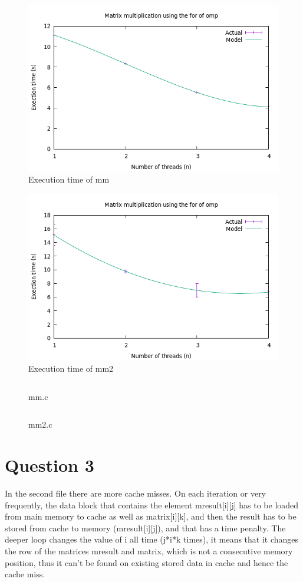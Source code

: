 \documentclass[12pt]{article}
\begin{document}
\begin{figure}[h!]
	\centering
	\includegraphics[width=0.7\linewidth]{mm.png}
	\caption{Execution time of mm}
	\label{fig:mm}
\end{figure}

\begin{figure}[h!]
	\centering
	\includegraphics[width=0.7\linewidth]{mm2.png}
	\caption{Execution time of mm2}
	\label{fig:mm2}
\end{figure}

\newpage

\begin{figure}[h!]
	\inputminted{c}{mm.c}
	\caption{mm.c}\label{code:mmomp}
\end{figure}

\newpage

\begin{figure}[h!]
	\inputminted{c}{mm2.c}
	\caption{mm2.c}\label{code:mm2omp}
\end{figure}

\newpage

\section*{Question 3}

In the second file there are more cache misses. On each iteration or very frequently, the data block that contains the element mresult[i][j] has to be loaded from main memory to cache as well as matrix[i][k], and then the result has to be stored from cache to memory (mresult[i][j]), and that has a time penalty. The deeper loop changes the value of i all time (j*i*k times), it means that it changes the row of the matrices mresult and matrix, which is not a consecutive memory position, thus it can't be found on existing stored data in cache and hence the cache miss.
\end{document}
